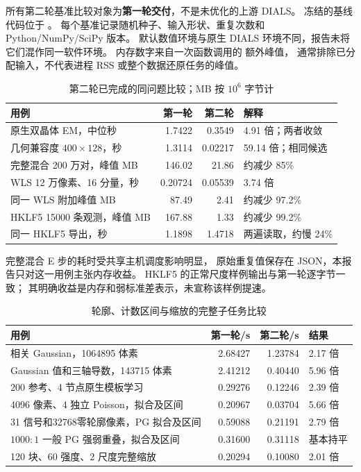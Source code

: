 \documentclass[UTF8,11pt,a4paper,fontset=fandol]{ctexart}
\begin{document}
所有第二轮基准比较对象为\textbf{第一轮交付}，不是未优化的上游 DIALS。
冻结的基线代码位于
。
每个基准记录随机种子、输入形状、重复次数和 Python/NumPy/SciPy 版本。
默认数值环境与原生 DIALS 环境不同，报告未将它们混作同一软件环境。
内存数字来自一次函数调用的  额外峰值，
通常排除已分配输入，不代表进程 RSS 或整个数据还原任务的峰值。

\begin{table}[htbp]
\centering\small
\caption{第二轮已完成的同问题比较；MB 按 $10^6$ 字节计}
\begin{tabularx}{\textwidth}{@{}p{}rrX@{}}
\toprule
用例 & 第一轮 & 第二轮 & 解释\\
\midrule
原生双晶体 EM，中位秒 & 1.7422 & 0.3549 & 4.91 倍；两者收敛\\
几何兼容度 $400\times128$，秒 & 1.3114 & 0.02217 & 59.14 倍；相同候选\\
完整混合 200 万对，峰值 MB & 146.02 & 21.86 & 约减少 85\%\\
WLS 12 万像素、16 分量，秒 & 0.20724 & 0.05539 & 3.74 倍\\
同一 WLS 附加峰值 MB & 87.49 & 2.41 & 约减少 97.2\%\\
HKLF5 15000 条观测，峰值 MB & 167.88 & 1.33 & 约减少 99.2\%\\
同一 HKLF5 导出，秒 & 1.1898 & 1.4718 & 两遍读取，约慢 24\%\\
\bottomrule
\end{tabularx}
\label{tab:benchmarks}
\end{table}

完整混合 E 步的耗时受共享主机调度影响明显，
原始重复值保存在 JSON，本报告只对这一用例主张内存收益。
HKLF5 的正常尺度样例输出与第一轮逐字节一致；
其明确收益是内存和弱标准差表示，未宣称该样例提速。

\begin{table}[htbp]
\centering\small
\caption{轮廓、计数区间与缩放的完整子任务比较}
\begin{tabularx}{\textwidth}{@{}p{}rrX@{}}
\toprule
用例 & 第一轮/s & 第二轮/s & 结果\\
\midrule
相关 Gaussian，1064895 体素 & 2.68427 & 1.23784 & 2.17 倍\\
Gaussian 值和三轴导数，143715 体素 & 2.41212 & 0.40440 & 5.96 倍\\
200 参考、4 节点原生模板学习 & 0.29276 & 0.12246 & 2.39 倍\\
4096 像素、4 独立 Poisson，拟合及区间 & 0.20967 & 0.03704 & 5.66 倍\\
31 信号和32768零轮廓像素，PG 拟合及区间 & 0.59088 & 0.21191 & 2.79 倍\\
$1000:1$ 一般 PG 强弱重叠，拟合及区间 & 0.31600 & 0.31118 & 基本持平\\
120 块、60 强度、2 尺度完整缩放 & 0.20294 & 0.10080 & 2.01 倍\\
\bottomrule
\end{tabularx}
\end{table}
\end{document}
